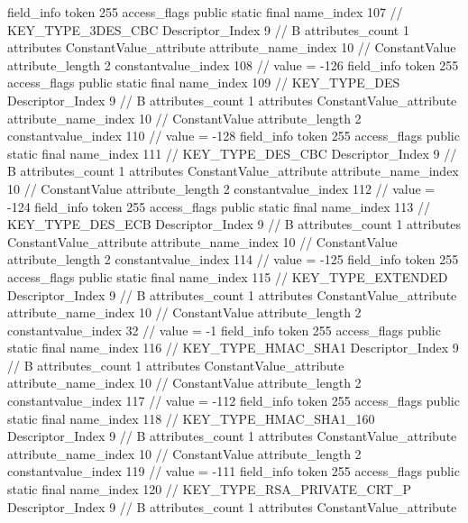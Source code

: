 {{{{{{{				}
				}
			}
			field_info {
				token	255
				access_flags	public static final
				name_index	107		// KEY_TYPE_3DES_CBC
				Descriptor_Index	9		// B
				attributes_count	1
				attributes {
				ConstantValue_attribute {
					attribute_name_index	10		// ConstantValue
					attribute_length	2
					constantvalue_index	108		// value = -126
				}
				}
			}
			field_info {
				token	255
				access_flags	public static final
				name_index	109		// KEY_TYPE_DES
				Descriptor_Index	9		// B
				attributes_count	1
				attributes {
				ConstantValue_attribute {
					attribute_name_index	10		// ConstantValue
					attribute_length	2
					constantvalue_index	110		// value = -128
				}
				}
			}
			field_info {
				token	255
				access_flags	public static final
				name_index	111		// KEY_TYPE_DES_CBC
				Descriptor_Index	9		// B
				attributes_count	1
				attributes {
				ConstantValue_attribute {
					attribute_name_index	10		// ConstantValue
					attribute_length	2
					constantvalue_index	112		// value = -124
				}
				}
			}
			field_info {
				token	255
				access_flags	public static final
				name_index	113		// KEY_TYPE_DES_ECB
				Descriptor_Index	9		// B
				attributes_count	1
				attributes {
				ConstantValue_attribute {
					attribute_name_index	10		// ConstantValue
					attribute_length	2
					constantvalue_index	114		// value = -125
				}
				}
			}
			field_info {
				token	255
				access_flags	public static final
				name_index	115		// KEY_TYPE_EXTENDED
				Descriptor_Index	9		// B
				attributes_count	1
				attributes {
				ConstantValue_attribute {
					attribute_name_index	10		// ConstantValue
					attribute_length	2
					constantvalue_index	32		// value = -1
				}
				}
			}
			field_info {
				token	255
				access_flags	public static final
				name_index	116		// KEY_TYPE_HMAC_SHA1
				Descriptor_Index	9		// B
				attributes_count	1
				attributes {
				ConstantValue_attribute {
					attribute_name_index	10		// ConstantValue
					attribute_length	2
					constantvalue_index	117		// value = -112
				}
				}
			}
			field_info {
				token	255
				access_flags	public static final
				name_index	118		// KEY_TYPE_HMAC_SHA1_160
				Descriptor_Index	9		// B
				attributes_count	1
				attributes {
				ConstantValue_attribute {
					attribute_name_index	10		// ConstantValue
					attribute_length	2
					constantvalue_index	119		// value = -111
				}
				}
			}
			field_info {
				token	255
				access_flags	public static final
				name_index	120		// KEY_TYPE_RSA_PRIVATE_CRT_P
				Descriptor_Index	9		// B
				attributes_count	1
				attributes {
				ConstantValue_attribute {
}}}}}}}
